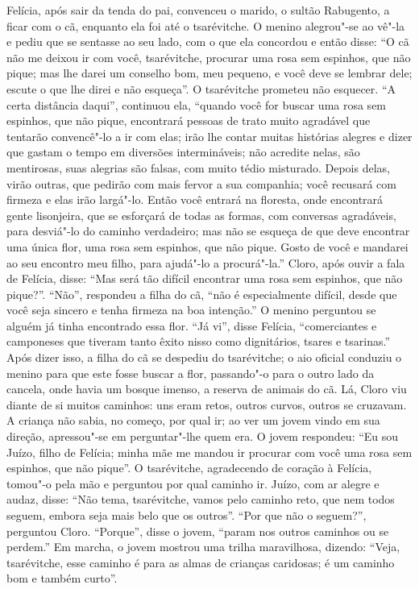 Felícia, após sair da tenda do pai, convenceu o marido, o sultão
Rabugento, a ficar com o cã, enquanto ela foi até o tsarévitche. O
menino alegrou"-se ao vê"-la e pediu que se sentasse ao seu lado, com o
que ela concordou e então disse: ``O cã não me deixou ir com você,
tsarévitche, procurar uma rosa sem espinhos, que não pique; mas lhe
darei um conselho bom, meu pequeno, e você deve se lembrar dele; escute
o que lhe direi e não esqueça''. O tsarévitche prometeu não esquecer.
``A certa distância daqui'', continuou ela, ``quando você for buscar uma
rosa sem espinhos, que não pique, encontrará pessoas de trato muito
agradável que tentarão convencê"-lo a ir com elas; irão lhe contar muitas
histórias alegres e dizer que gastam o tempo em diversões intermináveis;
não acredite nelas, são mentirosas, suas alegrias são falsas, com muito
tédio misturado. Depois delas, virão outras, que pedirão com mais fervor
a sua companhia; você recusará com firmeza e elas irão largá"-lo. Então
você entrará na floresta, onde encontrará gente lisonjeira, que se
esforçará de todas as formas, com conversas agradáveis, para desviá"-lo
do caminho verdadeiro; mas não se esqueça de que deve encontrar uma
única flor, uma rosa sem espinhos, que não pique. Gosto de você e
mandarei ao seu encontro meu filho, para ajudá"-lo a procurá"-la.'' Cloro,
após ouvir a fala de Felícia, disse: ``Mas será tão difícil encontrar
uma rosa sem espinhos, que não pique?''. ``Não'', respondeu a filha do
cã, ``não é especialmente difícil, desde que você seja sincero e tenha
firmeza na boa intenção.'' O menino perguntou se alguém já tinha
encontrado essa flor. ``Já vi'', disse Felícia, ``comerciantes e
camponeses que tiveram tanto êxito nisso como dignitários, tsares e
tsarinas.'' Após dizer isso, a filha do cã se despediu do tsarévitche; o
aio oficial conduziu o menino para que este fosse buscar a flor, passando"-o para o outro lado da cancela, onde
havia um bosque imenso, a reserva de animais do cã. Lá, Cloro viu diante
de si muitos caminhos: uns eram retos, outros curvos, outros se
cruzavam. A criança não sabia, no começo, por qual ir; ao ver um jovem
vindo em sua direção, apressou"-se em perguntar"-lhe quem era. O jovem
respondeu: ``Eu sou Juízo, filho de Felícia; minha mãe me mandou ir
procurar com você uma rosa sem espinhos, que não pique''. O tsarévitche,
agradecendo de coração à Felícia, tomou"-o pela mão e perguntou por qual
caminho ir. Juízo, com ar alegre e audaz, disse: ``Não tema,
tsarévitche, vamos pelo caminho reto, que nem todos seguem, embora seja
mais belo que os outros''. ``Por que não o seguem?'', perguntou Cloro.
``Porque'', disse o jovem, ``param nos outros caminhos ou se perdem.''
Em marcha, o jovem mostrou uma trilha maravilhosa, dizendo: ``Veja,
tsarévitche, esse caminho é para as almas de crianças caridosas; é um
caminho bom e também curto''.

